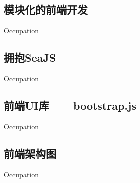 
\subsection{模块化的前端开发}
\indent
Occupation

\subsection{拥抱SeaJS}
\indent
Occupation

\subsection{前端UI库——bootstrap.js}
\indent
Occupation

\subsection{前端架构图}
\indent
Occupation